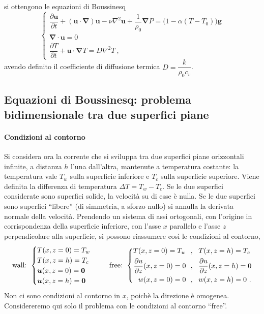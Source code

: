 si ottengono le equazioni di Boussinesq
\begin{equation}
    \begin{cases}
      \dfrac{\partial \bm{u}}{\partial t} + 
      \left( \bm{u} \cdot \bm{\nabla} \right) \bm{u} -
      \nu \nabla^2 \bm{u} + \dfrac{1}{\rho_0}\bm{\nabla} P = \big( 1 - \alpha ( T-T_0 ) \big) \bm{g} \\
      \bm{\nabla} \cdot \bm{u} = 0 \\
      \dfrac{\partial T}{\partial t} + \bm{u} \cdot 
      \bm{\nabla} T =  D \nabla^2 T \ ,
    \end{cases}
\end{equation}
avendo definito il coefficiente di diffusione termica $D = \dfrac{k}{\rho_0 c_v}$.

\subsection{Equazioni di Boussinesq: problema bidimensionale tra due superfici piane}

\paragraph{Condizioni al contorno}
Si considera ora la corrente che si sviluppa tra due superfici piane orizzontali infinite, a distanza $h$ l'una dall'altra, mantenute a temperatura costante: la temperatura vale $T_w$ sulla superficie inferiore e $T_c$ sulla superficie superiore. Viene definita la differenza di temperatura $\Delta T = T_w - T_c$.
\newline
Se le due superfici considerate sono superfici solide, la velocità su di esse è nulla. Se le due superfici sono superfici ``libere'' (di simmetria, a sforzo nullo) si annulla la derivata normale della velocità. Prendendo un sistema di assi ortogonali, con l'origine in corrispondenza della superficie inferiore, con l'asse $x$ parallelo e l'asse $z$ perpendicolare alla superficie, si possono riassumere così le condizioni al contorno,
\begin{equation}
    \text{wall: }
    \begin{cases}
      T(x,z=0) = T_w \\ T(x,z=h) = T_c \\
      \bm{u}(x,z=0) = \bm{0} \\ \bm{u}(x,z=h) = \bm{0}
    \end{cases}  \hspace{0.5cm}
    \text{free: } \left\{
    \begin{aligned}
      T(x,z=0) = T_w \ & \ , \ \ T(x,z=h) = T_c \\
      \dfrac{\partial u}{\partial z}(x,z=0) = 0 \ & \ , \ \ \dfrac{\partial u}{\partial z}(x,z=h) = 0 \\
      w(x,z=0) = 0 \ & \  , \  \  w(x,z=h) = 0 \ .
    \end{aligned} \right.
\end{equation}
Non ci sono condizioni al contorno in $x$, poichè la direzione è omogenea. Considereremo qui solo il problema con le condizioni al contorno ``free''.


